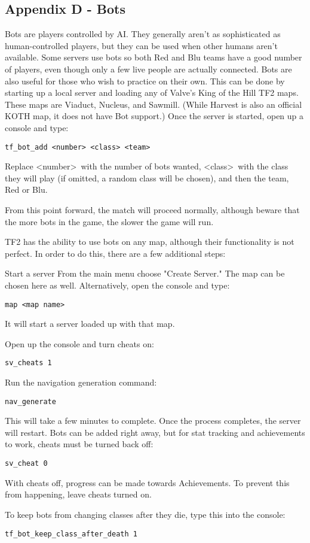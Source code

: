 \subsection{Appendix D - Bots}
\label{Bots}
Bots are players controlled by AI.  They generally aren't as sophisticated as human-controlled players, but they can be used when other humans aren't available.  Some servers use bots so both Red and Blu teams have a good number of players, even though only a few live people are actually connected.  Bots are also useful for those who wish to practice on their own.  This can be done by starting up a local server and loading any of Valve's King of the Hill TF2 maps. These maps are Viaduct, Nucleus, and Sawmill.  (While Harvest is also an official KOTH map, it does not have Bot support.)  Once the server is started, open up a console and type:
\begin{lstlisting}
tf_bot_add <number> <class> <team>
\end{lstlisting}
Replace \textless number\textgreater~with the number of bots wanted, \textless class\textgreater~with the class they will play (if omitted, a random class will be chosen), and then the team, Red or Blu.

From this point forward, the match will proceed normally, although beware that the more bots in the game, the slower the game will run.

TF2 has the ability to use bots on any map, although their functionality is not perfect.  In order to do this, there are a few additional steps:

Start a server From the main menu choose "Create Server."  The map can be chosen here as well.  Alternatively, open the console and type:
\begin{lstlisting}
map <map name>
\end{lstlisting}
It will start a server loaded up with that map.

Open up the console and turn cheats on:
\begin{lstlisting}
sv_cheats 1
\end{lstlisting}
Run the navigation generation command:
\begin{lstlisting}
nav_generate
\end{lstlisting}
This will take a few minutes to complete.  Once the process completes, the server will restart.  Bots can be added right away, but for stat tracking and achievements to work, cheats must be turned back off:
\begin{lstlisting}
sv_cheat 0
\end{lstlisting}
With cheats off, progress can be made towards Achievements.  To prevent this from happening, leave cheats turned on.

To keep bots from changing classes after they die, type this into the console:
\begin{lstlisting}
tf_bot_keep_class_after_death 1
\end{lstlisting}